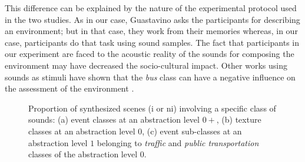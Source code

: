 \documentclass[twoside,twocolumn]{article}
\begin{document}
This difference can be explained by the nature of the experimental protocol used in the two studies. As in our case, Guastavino asks the participants for describing an environment; but in that case, they work from their memories whereas, in our case, participants do that task using sound samples. The fact that participants in our experiment are faced to the acoustic reality of the sounds for composing the environment may have decreased the socio-cultural impact. Other works using sounds as stimuli have shown that the \emph{bus} class can have a negative influence on the assessment of the environment \cite{lavandier2006contribution}.

\begin{figure}[t]
        \myfloatalign
         \par
       \caption{Proportion of synthesized scenes (i or ni) involving a specific class of sounds: (a) event classes at an abstraction level $0+$, (b) texture classes at an abstraction level $0$, (c) event sub-classes at an abstraction level $1$ belonging to \emph{traffic} and \emph{public transportation} classes of the abstraction level $0$.}\label{fig:soundsource}
\end{figure}
\end{document}
